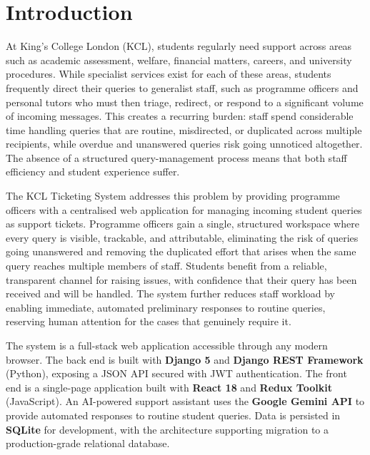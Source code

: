 \chapter{Introduction}

At King's College London (KCL), students regularly
need support across areas such as academic assessment, welfare, financial
matters, careers, and university procedures. While specialist services exist for
each of these areas, students frequently direct their queries to generalist
staff, such as programme officers and personal tutors who must then triage,
redirect, or respond to a significant volume of incoming messages. This creates
a recurring burden: staff spend considerable time handling queries that are
routine, misdirected, or duplicated across multiple recipients, while overdue
and unanswered queries risk going unnoticed altogether. The absence of a
structured query-management process means that both staff efficiency and student
experience suffer.

The KCL Ticketing System addresses this problem by providing programme officers
with a centralised web application for managing incoming student queries as
support tickets. Programme officers gain a single, structured workspace where
every query is visible, trackable, and attributable, eliminating the risk of
queries going unanswered and removing the duplicated effort that arises when the
same query reaches multiple members of staff. Students benefit from a reliable,
transparent channel for raising issues, with confidence that their query has
been received and will be handled. The system further reduces staff workload by
enabling immediate, automated preliminary responses to routine queries,
reserving human attention for the cases that genuinely require it.

The system is a full-stack web application accessible through any modern
browser. The back end is built with \textbf{Django 5} and
\textbf{Django REST Framework} (Python), exposing a JSON API secured with
JWT authentication. The front end is a single-page application built with
\textbf{React 18} and \textbf{Redux Toolkit} (JavaScript). An AI-powered
support assistant uses the \textbf{Google Gemini API} to provide automated
responses to routine student queries. Data is persisted in
\textbf{SQLite} for development, with the architecture supporting migration to a
production-grade relational database.
